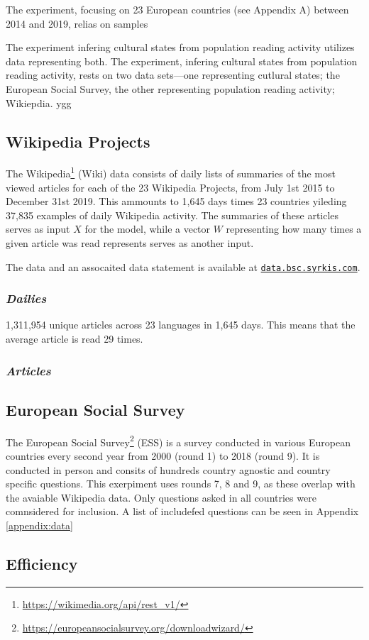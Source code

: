 The experiment, focusing on 23 European countries (see Appendix A) between 2014 and 2019, relias on samples


The experiment infering cultural states from population reading activity utilizes data representing both. The experiment, infering cultural states from population reading activity, rests on two data sets—one representing cutlural states; the European Social Survey, the other representing population reading activity; Wikiepdia.
ygg

\subsection*{Wikipedia Projects}

The Wikipedia\footnote{\url{https://wikimedia.org/api/rest_v1/}} (Wiki) data consists of daily lists of summaries of the most viewed articles for each of the 23 Wikipedia Projects, from July 1st 2015 to December 31st 2019.
This ammounts to 1,645 days times 23 countries yileding 37,835 examples of daily Wikipedia activity.
The summaries of these articles serves as input $X$ for the model, while a vector $W$ representing how many times a given article was read represents serves as another input.

The data and an assocaited data statement is available at \href{https://data.bsc.syrkis.com}{\texttt{data.bsc.syrkis.com}}.

\subsubsection*{\emph{Dailies}}
1,311,954 unique articles across 23 languages in 1,645 days. This means that the average article is read 29 times.

\subsubsection*{\emph{Articles}}

\subsection*{European Social Survey}

The European Social Survey\footnote{\url{https://europeansocialsurvey.org/downloadwizard/}} (ESS) is a survey conducted in various European countries every second year from 2000 (round 1) to 2018 (round 9). It is conducted in person and consits of hundreds country agnostic and country specific questions. This exerpiment uses rounds 7, 8 and 9, as these overlap with the avaiable Wikipedia data.
Only questions asked in all countries were comnsidered for inclusion. A list of includefed questions can be seen in Appendix  \ref{appendix:data}


\subsection*{Efficiency}

